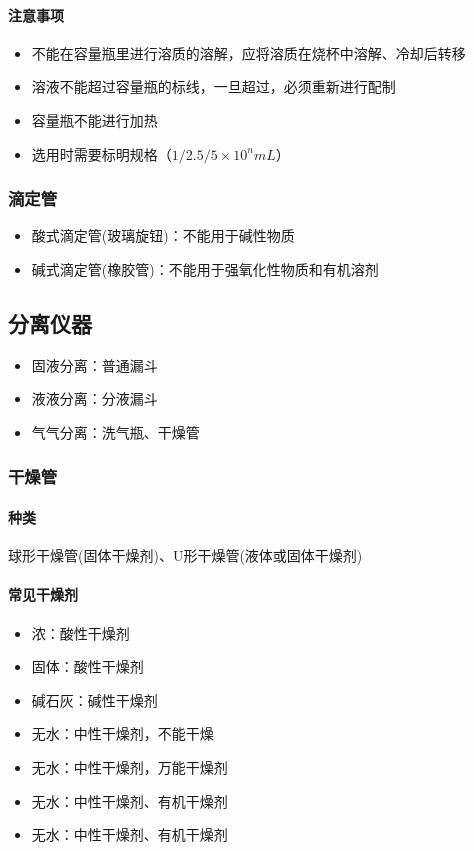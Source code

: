 \documentclass[a4paper]{article}
\begin{document}
	\paragraph{注意事项}
	\begin{itemize}
		\item 不能在容量瓶里进行溶质的溶解，应将溶质在烧杯中溶解、冷却后转移
		\item 溶液不能超过容量瓶的标线，一旦超过，必须重新进行配制
		\item 容量瓶不能进行加热
		\item 选用时需要标明规格（$1/2.5/5\times 10^n mL$）
	\end{itemize}
	
	\subsubsection{滴定管}
	\begin{itemize}
		\item 酸式滴定管(玻璃旋钮)：不能用于碱性物质
		\item 碱式滴定管(橡胶管)：不能用于强氧化性物质和有机溶剂
	\end{itemize}
	
	
	\subsection{分离仪器}
	\begin{itemize}
		\item 固液分离：普通漏斗
		\item 液液分离：分液漏斗
		\item 气气分离：洗气瓶、干燥管
	\end{itemize}
	
	\subsubsection{干燥管}
	\paragraph{种类}
	球形干燥管(固体干燥剂)、U形干燥管(液体或固体干燥剂)
	\paragraph{常见干燥剂}
	\begin{itemize}
		\item 浓：酸性干燥剂
		\item {}固体：酸性干燥剂
		\item 碱石灰：碱性干燥剂
		\item 无水：中性干燥剂，不能干燥
		\item 无水：中性干燥剂，万能干燥剂
		\item 无水：中性干燥剂、有机干燥剂
		\item 无水：中性干燥剂、有机干燥剂
	\end{itemize}
	
\end{document}
